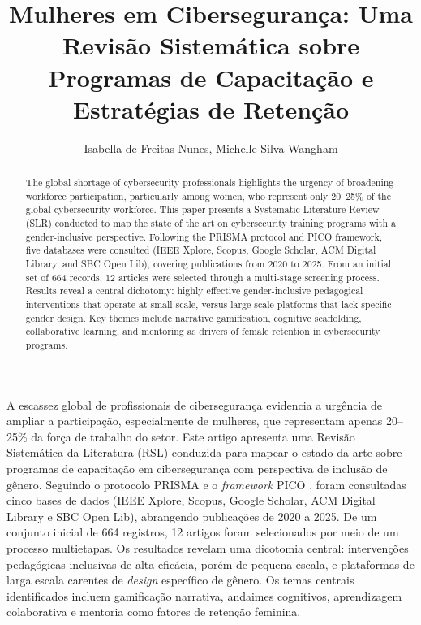 \documentclass[12pt]{article}
\title{Mulheres em Cibersegurança: Uma Revisão Sistemática sobre Programas de Capacitação e Estratégias de Retenção}
\author{}
\author{Isabella de Freitas Nunes\inst{1}, Michelle Silva Wangham\inst{1}}
\begin{document}
\maketitle

\begin{abstract}
  The global shortage of cybersecurity professionals highlights the urgency of broadening workforce participation, particularly among women, who represent only 20--25\% of the global cybersecurity workforce. This paper presents a Systematic Literature Review (SLR) conducted to map the state of the art on cybersecurity training programs with a gender-inclusive perspective. Following the PRISMA protocol and PICO framework, five databases were consulted (IEEE Xplore, Scopus, Google Scholar, ACM Digital Library, and SBC Open Lib), covering publications from 2020 to 2025. From an initial set of 664 records, 12 articles were selected through a multi-stage screening process. Results reveal a central dichotomy: highly effective gender-inclusive pedagogical interventions that operate at small scale, versus large-scale platforms that lack specific gender design. Key themes include narrative gamification, cognitive scaffolding, collaborative learning, and mentoring as drivers of female retention in cybersecurity programs.
\end{abstract}

\begin{resumo}
  A escassez global de profissionais de cibersegurança evidencia a urgência de ampliar a participação, especialmente de mulheres, que representam apenas 20--25\% da força de trabalho do setor. Este artigo apresenta uma Revisão Sistemática da Literatura (RSL) conduzida para mapear o estado da arte sobre programas de capacitação em cibersegurança com perspectiva de inclusão de gênero. Seguindo o protocolo PRISMA e o \textit{framework} PICO \cite{Schardt2007}, foram consultadas cinco bases de dados (IEEE Xplore, Scopus, Google Scholar, ACM Digital Library e SBC Open Lib), abrangendo publicações de 2020 a 2025. De um conjunto inicial de 664 registros, 12 artigos foram selecionados por meio de um processo multietapas. Os resultados revelam uma dicotomia central: intervenções pedagógicas inclusivas de alta eficácia, porém de pequena escala, e plataformas de larga escala carentes de \textit{design} específico de gênero. Os temas centrais identificados incluem gamificação narrativa, andaimes cognitivos, aprendizagem colaborativa e mentoria como fatores de retenção feminina.
\end{resumo}
\end{document}
